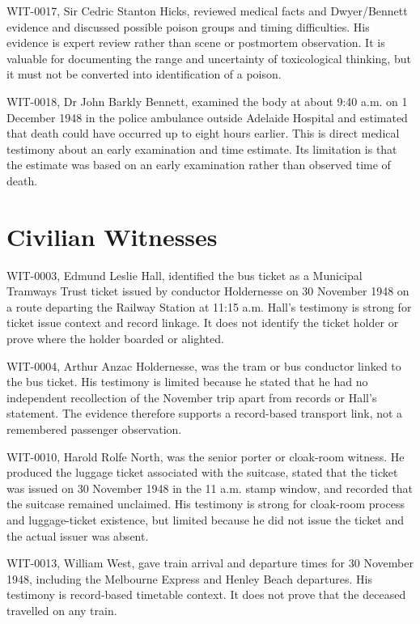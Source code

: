 WIT-0017, Sir Cedric Stanton Hicks, reviewed medical facts and Dwyer/Bennett evidence and discussed possible poison groups and timing difficulties. His evidence is expert review rather than scene or postmortem observation. It is valuable for documenting the range and uncertainty of toxicological thinking, but it must not be converted into identification of a poison.

WIT-0018, Dr John Barkly Bennett, examined the body at about 9:40 a.m. on 1 December 1948 in the police ambulance outside Adelaide Hospital and estimated that death could have occurred up to eight hours earlier. This is direct medical testimony about an early examination and time estimate. Its limitation is that the estimate was based on an early examination rather than observed time of death.

\section{Civilian Witnesses}

WIT-0003, Edmund Leslie Hall, identified the bus ticket as a Municipal Tramways Trust ticket issued by conductor Holdernesse on 30 November 1948 on a route departing the Railway Station at 11:15 a.m. Hall's testimony is strong for ticket issue context and record linkage. It does not identify the ticket holder or prove where the holder boarded or alighted.

WIT-0004, Arthur Anzac Holdernesse, was the tram or bus conductor linked to the bus ticket. His testimony is limited because he stated that he had no independent recollection of the November trip apart from records or Hall's statement. The evidence therefore supports a record-based transport link, not a remembered passenger observation.

WIT-0010, Harold Rolfe North, was the senior porter or cloak-room witness. He produced the luggage ticket associated with the suitcase, stated that the ticket was issued on 30 November 1948 in the 11 a.m. stamp window, and recorded that the suitcase remained unclaimed. His testimony is strong for cloak-room process and luggage-ticket existence, but limited because he did not issue the ticket and the actual issuer was absent.

WIT-0013, William West, gave train arrival and departure times for 30 November 1948, including the Melbourne Express and Henley Beach departures. His testimony is record-based timetable context. It does not prove that the deceased travelled on any train.

